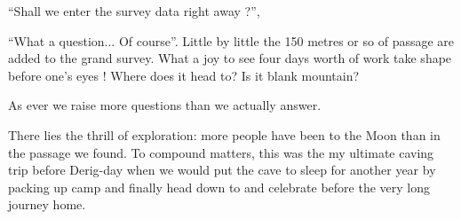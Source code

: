 ``Shall we enter the survey data right away ?'',

``What a question... Of course''. Little by little the 150 metres or so of passage are added to the grand survey. What a joy to see four days worth of work take shape before one's eyes ! Where does it head to? Is it blank mountain? 

As ever we raise more questions than we actually answer.

There lies the thrill of exploration: more people have been to the Moon than in the passage we found. To compound matters, this was the my ultimate caving trip before Derig-day when we would put the cave to sleep for another year by packing up camp  and finally head down to  and celebrate before the very long journey home. 





